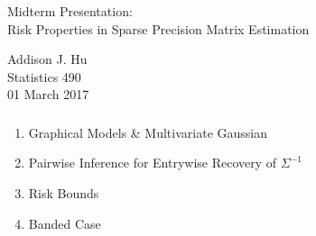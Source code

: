
\newcommand{\blueone}{{\color{yaleblue} 1}}
\newcommand{\greyzero}{{\color{solarized@base00} 0}}
\usepackage{sty/personalmacros}
\usepackage{sty/personalslides}


\begin{frame}[fragile] \frametitle{}
\vfill
\vspace{0.2cm}
{
    \color{yaleblue}
    \fontsize{0.5cm}{0cm}\selectfont
    Midterm Presentation: \\
}
\vspace{1.0cm}
{
    \fontsize{0.7cm}{0cm}\selectfont
    Risk Properties in Sparse Precision Matrix Estimation\\
}

\hfill

\vspace{1.8cm}
\begin{minipage}{1.0\textwidth}\raggedleft
    \color{yaleblue}
    Addison J. Hu   \\
    Statistics 490 \\
    01 March 2017
\end{minipage}
\end{frame}
\begin{frame}[fragile] \frametitle{}
    \begin{enumerate}
        \item Graphical Models \& Multivariate Gaussian
        \item Pairwise Inference for Entrywise Recovery of $\Sigma^{-1}$
        \item Risk Bounds
        \item Banded Case
    \end{enumerate}
\end{frame}

